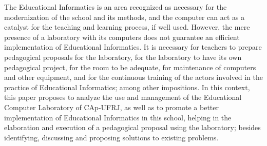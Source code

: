 The Educational Informatics is an area recognized as necessary for the modernization of the school and its methods, and the computer can act as a catalyst for the teaching and learning process, if well used. However, the mere presence of a laboratory with its computers does not guarantee an efficient implementation of Educational Informatics. It is necessary for teachers to prepare pedagogical proposals for the laboratory, for the laboratory to have its own pedagogical project, for the room to be adequate, for maintenance of computers and other equipment, and for the continuous training of the actors involved in the practice of Educational Informatics; among other impositions.
In this context, this paper proposes to analyze the use and management of the Educational Computer Laboratory of CAp-UFRJ, as well as to promote a better implementation of Educational Informatics in this school, helping in the elaboration and execution of a pedagogical proposal using the laboratory; besides identifying, discussing and proposing solutions to existing problems.